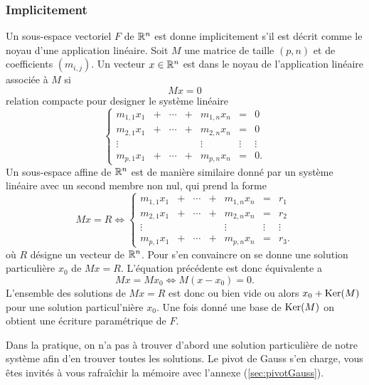 \documentclass[11pt, a4paper]{article}
\begin{document}
\subsubsection{Implicitement}

Un sous-espace vectoriel $F$ de $\mathbb{R}^n$ est donne implicitement
s'il est décrit comme le noyau d'une application linéaire. Soit $M$
une matrice de taille $(p, n)$ et de coefficients $(m_{i,j})$. Un
vecteur $x \in \mathbb{R}^n$ est dans le noyau de l'application
linéaire associée à $M$ si
\[
Mx = 0
\]
relation compacte pour designer le système linéaire
\[
\left\{\begin{array}{cccccccc}
m_{1, 1} x_1 & + & \cdots & + & m_{1, n}x_n & = & 0 \\
m_{2, 1} x_1 & + & \cdots & + & m_{2, n}x_n & = & 0 \\
\vdots & & & & \vdots & \vdots & \vdots \\
m_{p, 1}x_1 & + & \cdots & + & m_{p, n}x_n & = & 0.
\end{array}\right.
\]
Un sous-espace affine de $\mathbb{R}^n$ est de manière similaire donné
par un système linéaire avec un second membre non nul, qui prend la
forme
\[
Mx = R \Longleftrightarrow \left\{\begin{array}{cccccccc}
m_{1, 1} x_1 & + & \cdots & + & m_{1, n}x_n & = & r_1 \\
m_{2, 1} x_1 & + & \cdots & + & m_{2, n}x_n & = & r_2 \\
\vdots & & & & \vdots & \vdots & \vdots \\
m_{p, 1}x_1 & + & \cdots & + & m_{p, n}x_n & = & r_3.
\end{array}\right.
\]
où $R$ désigne un vecteur de $\mathbb{R}^n$. Pour s'en convaincre on
se donne une solution particulière $x_0$ de $Mx = R$. L'équation
précédente est donc équivalente a
\[
Mx = Mx_0 \Longleftrightarrow M(x-x_0) = 0.
\]
L'ensemble des solutions de $Mx = R$ est donc ou bien vide ou alors
$x_0 + \operatorname{Ker}(M)$ pour une solution particul'nière $x_0$. Une fois donné
une base de $\operatorname{Ker}(M)$ on obtient une écriture paramétrique de $F$.
\begin{rem}
  Dans la pratique, on n'a pas à trouver d'abord une solution
  particulière de notre système afin d'en trouver toutes les
  solutions. Le pivot de Gauss s'en charge, vous êtes invités à vous
  rafraîchir la mémoire avec l'annexe (\ref{sec:pivotGauss}).
\end{rem}
\end{document}
